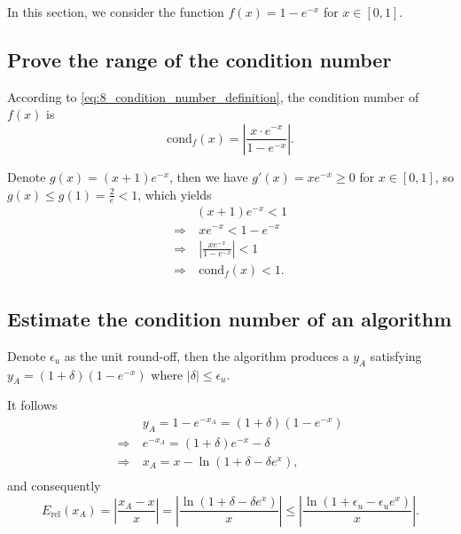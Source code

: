 \documentclass[a4paper]{article}
\begin{document}
In this section, we consider the function $f(x) = 1 - e^{-x}$ for $x \in [0, 1]$.

\subsection{Prove the range of the condition number}

According to \cref{eq:8_condition_number_definition}, the condition number of $f(x)$ is
\begin{equation}
    \text{cond}_f(x) = \left|\frac{x \cdot e^{-x}}{1 - e^{-x}}\right|.
    \label{eq:9_condition_number}
\end{equation}

Denote $g(x) = (x + 1)e^{-x}$, then we have $g'(x) = xe^{-x} \geqslant 0$ for $x \in [0, 1]$, so $g(x) \leqslant g(1) = \frac{2}{e} < 1$, which yields
\begin{equation}
    \begin{aligned}
        & (x + 1)e^{-x} < 1 \\ 
        \Rightarrow &\ xe^{-x} < 1 - e^{-x} \\ 
        \Rightarrow &\ \left|\frac{xe^{-x}}{1 - e^{-x}}\right| < 1 \\ 
        \Rightarrow &\ \text{cond}_f(x) < 1.
    \end{aligned}
    \label{eq:9_range_proof_condition_number}
\end{equation}

\subsection{Estimate the condition number of an algorithm}

Denote $\epsilon_u$ as the unit round-off, then the algorithm produces a $y_A$ satisfying $y_A = (1 + \delta)(1 - e^{-x})$ where $|\delta| \leqslant \epsilon_u$.

It follows 
\begin{equation}
    \begin{aligned}
        & y_A = 1 - e^{-x_A} = (1 + \delta)(1 - e^{-x}) \\
        \Rightarrow\ & e^{-x_A} = (1 + \delta)e^{-x} - \delta \\
        \Rightarrow\ & x_A = x - \ln (1 + \delta - \delta e^x), \\
    \end{aligned}
    \label{eq:9_estimate_x_A}
\end{equation}
and consequently
\begin{equation}
    E_{\text{rel}}(x_A) = \left|\frac{x_A - x}{x}\right| = \left|\frac{\ln(1 + \delta - \delta e^x)}{x}\right| \leqslant \left|\frac{\ln(1 + \epsilon_u - \epsilon_u e^x)}{x}\right|.
    \label{eq:9_estimate_error}
\end{equation}
\end{document}
